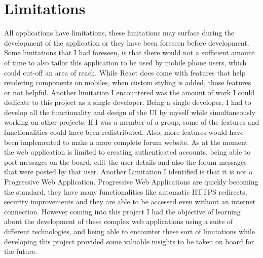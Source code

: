 \section{Limitations}
All applications have limitations, these limitations may surface during the development of the application or they have been foreseen before development. Some limitations that I had foreseen, is that there would not a sufficient amount of time to also tailor this application to be used by mobile phone users, which could cut-off an area of reach. While React does come with features that help rendering components on mobiles, when custom styling is added, those features or not helpful. Another limitation I encountered was the amount of work I could dedicate to this project as a single developer. Being a single developer, I had to develop all the functionality and design of the UI by myself while simultaneously working on other projects. If I was a member of a group, some of the features and functionalities could have been redistributed. Also, more features would have been implemented to make a more complete forum website. As at the moment the web application is limited to creating authenticated accounts, being able to post messages on the board, edit the user details and also the forum messages that were posted by that user. Another Limitation I identified is that it is not a Progressive Web Application. Progressive Web Applications are quickly becoming the standard, they have many functionalities like automatic HTTPS redirects, security improvements and they are able to be accessed even without an internet connection.
However coming into this project I had the objective of learning about the development of these complex web applications using a suite of different technologies, and being able to encounter these sort of limitations while developing this project provided some valuable insights to be taken on board for the future.


